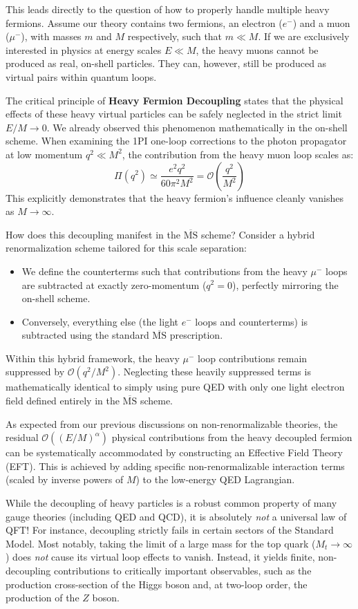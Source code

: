 This leads directly to the question of how to properly handle multiple heavy fermions. Assume our theory contains two fermions, an electron ($e^-$) and a muon ($\mu^-$), with masses $m$ and $M$ respectively, such that $m \ll M$. If we are exclusively interested in physics at energy scales $E \ll M$, the heavy muons cannot be produced as real, on-shell particles. They can, however, still be produced as virtual pairs within quantum loops.

The critical principle of \textbf{Heavy Fermion Decoupling} states that the physical effects of these heavy virtual particles can be safely neglected in the strict limit $E/M \to 0$. We already observed this phenomenon mathematically in the on-shell scheme. When examining the 1PI one-loop corrections to the photon propagator at low momentum $q^2 \ll M^2$, the contribution from the heavy muon loop scales as:
\[
    \Pi(q^2) \simeq \frac{e^2 q^2}{60 \pi^2 M^2} = \mathcal{O}\left(\frac{q^2}{M^2}\right)
\]
This explicitly demonstrates that the heavy fermion's influence cleanly vanishes as $M \to \infty$.

How does this decoupling manifest in the $\overline{\text{MS}}$ scheme? Consider a hybrid renormalization scheme tailored for this scale separation:
\begin{itemize}
    \item We define the counterterms such that contributions from the heavy $\mu^-$ loops are subtracted at exactly zero-momentum ($q^2=0$), perfectly mirroring the on-shell scheme.
    \item Conversely, everything else (the light $e^-$ loops and counterterms) is subtracted using the standard $\overline{\text{MS}}$ prescription.
\end{itemize}
Within this hybrid framework, the heavy $\mu^-$ loop contributions remain suppressed by $\mathcal{O}(q^2/M^2)$. Neglecting these heavily suppressed terms is mathematically identical to simply using pure QED with only one light electron field defined entirely in the $\overline{\text{MS}}$ scheme.

As expected from our previous discussions on non-renormalizable theories, the residual $\mathcal{O}((E/M)^\alpha)$ physical contributions from the heavy decoupled fermion can be systematically accommodated by constructing an Effective Field Theory (EFT). This is achieved by adding specific non-renormalizable interaction terms (scaled by inverse powers of $M$) to the low-energy QED Lagrangian.

While the decoupling of heavy particles is a robust common property of many gauge theories (including QED and QCD), it is absolutely \textit{not} a universal law of QFT! For instance, decoupling strictly fails in certain sectors of the Standard Model. Most notably, taking the limit of a large mass for the top quark ($M_t \to \infty$) does \textit{not} cause its virtual loop effects to vanish. Instead, it yields finite, non-decoupling contributions to critically important observables, such as the production cross-section of the Higgs boson and, at two-loop order, the production of the $Z$ boson.

